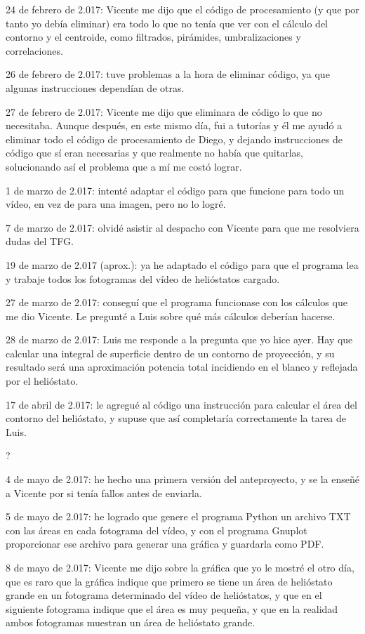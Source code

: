 \documentclass[12pt]{article}
\begin{document}
24 de febrero de 2.017: Vicente me dijo que el código de procesamiento (y que por tanto yo debía eliminar) era todo lo que no tenía que ver con el cálculo del contorno y el centroide, como filtrados, pirámides, umbralizaciones y correlaciones.

26 de febrero de 2.017: tuve problemas a la hora de eliminar código, ya que algunas instrucciones dependían de otras.

27 de febrero de 2.017: Vicente me dijo que eliminara de código lo que no necesitaba. Aunque después, en este mismo día, fui a tutorías y él me ayudó a eliminar todo el código de procesamiento de Diego, y dejando instrucciones de código que sí eran necesarias y que realmente no había que quitarlas, solucionando así el problema que a mí me costó lograr.

1 de marzo de 2.017: intenté adaptar el código para que funcione para todo un vídeo, en vez de para una imagen, pero no lo logré.

7 de marzo de 2.017: olvidé asistir al despacho con Vicente para que me resolviera dudas del TFG.

19 de marzo de 2.017 (aprox.): ya he adaptado el código para que el programa lea y trabaje todos los fotogramas del vídeo de helióstatos cargado.

27 de marzo de 2.017: conseguí que el programa funcionase con los cálculos que me dio Vicente. Le pregunté a Luis sobre qué más cálculos deberían hacerse.

28 de marzo de 2.017: Luis me responde a la pregunta que yo hice ayer. Hay que calcular una integral de superficie dentro de un contorno de proyección, y su resultado será una aproximación potencia total incidiendo en el blanco y reflejada por el helióstato.

17 de abril de 2.017: le agregué al código una instrucción para calcular el área del contorno del helióstato, y supuse que así completaría correctamente la tarea de Luis.

?

4 de mayo de 2.017: he hecho una primera versión del anteproyecto, y se la enseñé a Vicente por si tenía fallos antes de enviarla.

5 de mayo de 2.017: he logrado que genere el programa Python un archivo TXT con las áreas en cada fotograma del vídeo, y con el programa Gnuplot proporcionar ese archivo para generar una gráfica y guardarla como PDF.

8 de mayo de 2.017: Vicente me dijo sobre la gráfica que yo le mostré el otro día, que es raro que la gráfica indique que primero se tiene un área de helióstato grande en un fotograma determinado del vídeo de helióstatos, y que en el siguiente fotograma indique que el área es muy pequeña, y que en la realidad ambos fotogramas muestran un área de helióstato grande.
\end{document}
